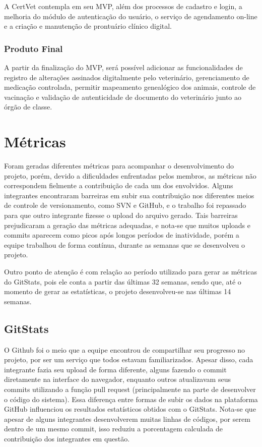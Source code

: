 \documentclass[
    12pt,               %
    openright,          %
    oneside,
    a4paper,            %
    BIBLATEX,           %
    TODO,               %
    english,            %
    brazil              %
    ]{ifsp-spo-inf-ctds}
\begin{document}
            A CertVet contempla em seu MVP, além dos processos de cadastro e login, a melhoria do módulo de autenticação do usuário, o serviço de agendamento on-line e a criação e manutenção de prontuário clínico digital.
        
        \subsubsection{Produto Final}
        
            A partir da finalização do MVP, será possível adicionar as funcionalidades de registro de alterações assinados digitalmente pelo veterinário, gerenciamento de medicação controlada, permitir mapeamento genealógico dos animais, controle de vacinação e validação de autenticidade de documento do veterinário junto ao órgão de classe.
            
            
 \section{Métricas}

    Foram geradas diferentes métricas para acompanhar o desenvolvimento do projeto, porém, devido a dificuldades enfrentadas pelos membros, as métricas não correspondem fielmente a contribuição de cada um dos envolvidos. Alguns integrantes encontraram barreiras em subir sua contribuição nos diferentes meios de controle de versionamento, como SVN e GitHub, e o trabalho foi repassado para que outro integrante fizesse o upload do arquivo gerado.
    Tais barreiras prejudicaram a geração das métricas adequadas, e nota-se que muitos uploads e commits aparecem como picos após longos períodos de inatividade, porém a equipe trabalhou de forma contínua, durante as semanas que se desenvolveu o projeto. 
    
    Outro ponto de atenção é com relação ao período utilizado para gerar as métricas do GitStats, pois ele conta a partir das últimas 32 semanas, sendo que, até o momento de gerar as estatísticas, o projeto desenvolveu-se nas últimas 14 semanas.
    
    \subsection{GitStats}
    
    O Github foi o meio que a equipe encontrou de compartilhar seu progresso no projeto, por ser um serviço que todos estavam familiarizados. Apesar disso, cada integrante fazia seu upload de forma diferente, alguns fazendo o commit diretamente na interface do navegador, enquanto outros atualizavam seus commits utilizando a função pull request (principalmente na parte de desenvolver o código do sistema). Essa diferença entre formas de subir os dados na plataforma GitHub influenciou os resultados estatísticos obtidos com o GitStats. Nota-se que apesar de alguns integrantes desenvolverem muitas linhas de códigos, por serem dentro de um mesmo commit, isso reduziu a porcentagem calculada de contribuição dos integrantes em questão. 
    
\end{document}
